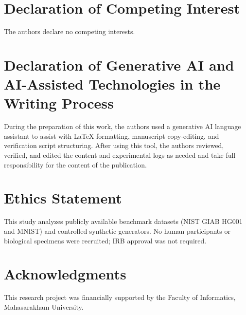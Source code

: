 \documentclass[11pt, a4paper]{article}
\begin{document}
\section*{Declaration of Competing Interest}
The authors declare no competing interests.

\section*{Declaration of Generative AI and AI-Assisted Technologies in the Writing Process}
During the preparation of this work, the authors used a generative AI language assistant to assist with LaTeX formatting, manuscript copy-editing, and verification script structuring. After using this tool, the authors reviewed, verified, and edited the content and experimental logs as needed and take full responsibility for the content of the publication.

\section*{Ethics Statement}
This study analyzes publicly available benchmark datasets (NIST GIAB HG001 and MNIST) and controlled synthetic generators. No human participants or biological specimens were recruited; IRB approval was not required.

\section*{Acknowledgments}
This research project was financially supported by the Faculty of Informatics, Mahasarakham University.
\end{document}
